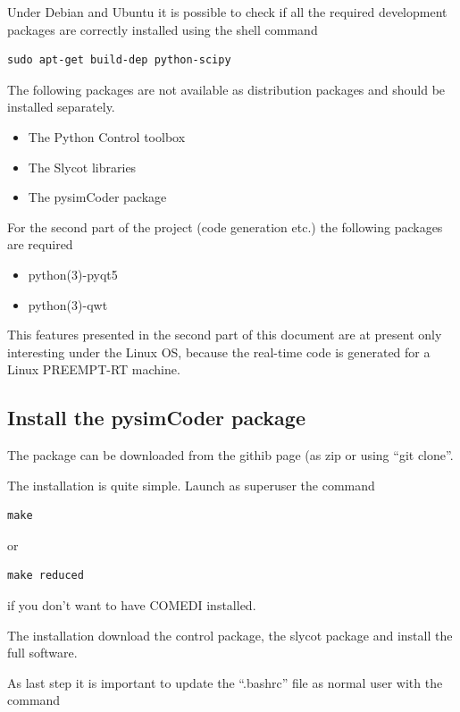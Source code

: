 Under Debian and Ubuntu it is possible to check if all the required development 
packages are correctly installed using the shell command

\begin{verbatim}
sudo apt-get build-dep python-scipy
\end{verbatim}

The following packages are not available as distribution packages and should be 
installed separately.

\begin{itemize}
\item The Python Control toolbox \cite{PYCONTROL}
\item The Slycot libraries \cite{SLYCOT}
\item The pysimCoder package \cite{SUPSICTRL}
\end{itemize}

For the second part of the project (code generation etc.) the following 
packages 
are required

\begin{itemize}
\item python(3)-pyqt5
\item  python(3)-qwt
\end{itemize}

This features presented in the second part of this document are at present only 
interesting under the Linux OS, because the real-time code is generated for a 
Linux PREEMPT-RT machine.

\subsection{Install the pysimCoder package}
The package can be downloaded from the githib page (as zip or using ``git clone''.

The installation is quite simple. Launch as superuser the command

\begin{verbatim}
make
\end{verbatim}

or

\begin{verbatim}
make reduced
\end{verbatim}

if you don't want to have COMEDI installed.

The installation download the control package, the slycot package 
and install the full software.

As last step it is important to update the ``.bashrc'' file as normal user with the command

